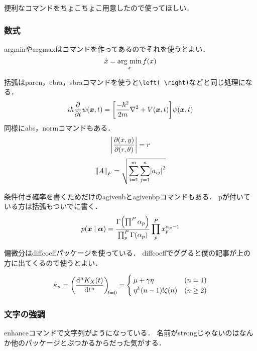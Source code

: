 便利なコマンドをちょこちょこ用意したので使ってほしい．

\subsubsection{数式}

argminやargmaxはコマンドを作ってあるのでそれを使うとよい．
\begin{equation}
    \hat{x} = \operatorname*{arg~min}_{x} f(x)
    \label{eq:eq1}
\end{equation}

括弧はparen，cbra，sbraコマンドを使うと\verb|\left( \right)|などと同じ処理になる．
\begin{equation}
    i\hbar\diffp*{\psi\paren{\bm{x},t}}{t} = \sbra{\frac{-\hbar^2}{2m}\nabla^2 + V\paren{\bm{x},t}}\psi\paren{\bm{x},t}
    \label{eq:eq2}
\end{equation}
同様にabs，normコマンドもある．
\begin{equation}
    \abs{\jacob{x,y}{r,\theta}} = r
    \label{eq:eq3}
\end{equation}
\begin{equation}
    \norm{A}_F = \sqrt{\sum_{i=1}^m\sum_{j=1}^n\abs{a_{ij}}^2}
    \label{eq:eq4}
\end{equation}

条件付き確率を書くためだけのagivenbとagivenbpコマンドもある．
pが付いている方は括弧もついでに書く．
\begin{equation}
    p\agivenbp{\bm{x}}{\bm{\alpha}} = \frac{\Gamma\paren{\prod^P\alpha_p}}{\prod_p^P\Gamma\paren{\alpha_p}}\prod_p^Px_p^{\alpha_p-1}
    \label{eq:eq5}
\end{equation}

偏微分はdiffcoeffパッケージを使っている．
diffcoeffでググると僕の記事が上の方に出てくるので使うとよい．

\begin{equation}
    \kappa_n = \diff[n]{K_X(t)}{t}[t=0] = \begin{cases}
        \mu+\gamma\eta & (n=1) \\
        \eta^k(n-1)!\zeta(n) & (n \geq 2)
    \end{cases}
    \label{eq:eq6}
\end{equation}

\subsubsection{文字の強調}

enhanceコマンドで文字列がようになっている．
名前がstrongじゃないのはなんか他のパッケージとぶつかるからだった気がする．

